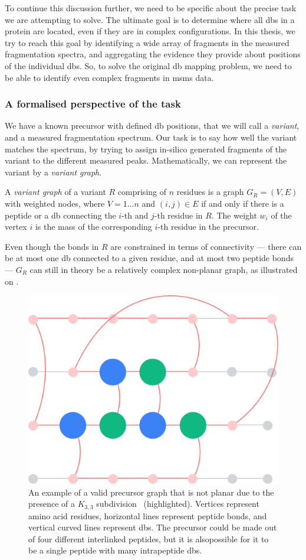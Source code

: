 To continue this discussion further, we need to be specific about the precise task we are attempting to solve. The ultimate goal is to determine where all \glspl*{db} in a protein are located, even if they are in complex configurations. In this thesis, we try to reach this goal by identifying a wide array of fragments in the measured fragmentation spectra, and aggregating the evidence they provide about positions of the individual \glspl*{db}. So, to solve the original \gls*{db} mapping problem, we need to be able to identify even complex fragments in \gls*{msms} data.

\subsubsection{A formalised perspective of the task}

We have a known precursor with defined \gls*{db} positions, that we will call a \emph{variant}, and a measured fragmentation spectrum. Our task is to say how well the variant matches the spectrum, by trying to assign in-silico generated fragments of the variant to the different measured peaks. Mathematically, we can represent the variant by a \emph{variant graph}.

\begin{defn}
  A \emph{variant graph} of a variant \(R\) comprising of \(n\) residues is a graph \(G_R = (V, E)\) with weighted nodes, where \(V  = 1\ldots n\) and \((i, j) \in E\) if and only if there is a peptide or a \gls*{db} connecting  the \(i\)-th and \(j\)-th residue in \(R\). The weight \(w_i\) of the vertex \(i\) is the mass of the corresponding \(i\)-th residue in the precursor.
\end{defn}

Even though the bonds in \(R\) are constrained in terms of connectivity --- there can be at most one \gls*{db} connected to a given residue, and at most two peptide bonds --- \(G_R\) can still in theory be a relatively complex non-planar graph, as illustrated on .

\begin{figure}
  \centering
  \includegraphics[width=0.5\linewidth]{img/nonplanar.pdf}
  \caption{An example of a valid precursor graph that is not planar due to the presence of a \(K_{3, 3}\) subdivision~\cite{kuratowski1930probleme} (highlighted). Vertices represent amino acid residues, horizontal lines represent peptide bonds, and vertical curved lines represent \glspl*{db}. The precursor could be made out of four different interlinked peptides, but it is alsopossible for it to be a single peptide with many intrapeptide \glspl*{db}.}\label{fig:nonplanar}
\end{figure}

